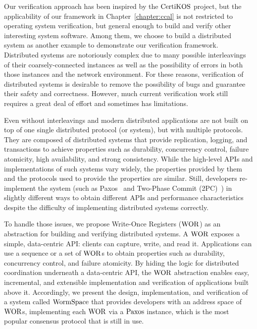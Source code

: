 
Our verification approach has been inspired by the $\mathrm{CertiKOS}$ project,
but the applicability of our framework in Chapter~\ref{chapter:ccal} is not restricted to operating system verification, but general enough
to build and verify other interesting system software. 
Among them, we choose to build a distributed system as another example to demonstrate our 
verification framework.
Distributed systems are notoriously complex due to  many possible interleavings of their coarsely-connected 
instances as well as the possibility of errors in both those instances and the network environment. 
For these reasons, verification of distributed systems is desirable to remove the possibility of bugs and guarantee their safety and correctness. 
However, much current verification work still requires a great deal of effort and sometimes has limitations.

Even without interleavings and%
modern distributed applications are not built on top of one single distributed protocol (or system), but with multiple protocols.
They are composed of distributed systems that provide replication, 
logging, and transactions to achieve properties such as durability, concurrency control, failure atomicity, high availability, and strong consistency.
While the high-level APIs and implementations of such systems vary widely, 
the properties provided by them and the protocols used to provide the properties are similar. 
Still, developers re-implement the system (such as Paxos~\cite{paxos} and 
Two-Phase Commit (2PC)~\cite{2PC}) in slightly different ways to obtain different APIs and performance 
characteristics despite the difficulty of implementing distributed systems correctly.

To handle those issues, we propose Write-Once Registers ($\mathrm{WOR}$) as an abstraction for building and verifying distributed systems. 
A $\mathrm{WOR}$ exposes a simple, data-centric API: 
clients can capture, write, and read it. 
Applications can use a sequence or a set of $\mathrm{WOR}$s to obtain properties such as durability, concurrency control, and failure atomicity. 
By hiding the logic for distributed coordination underneath a data-centric API, the $\mathrm{WOR}$ abstraction enables easy, incremental, 
and extensible implementation and verification of applications built above it. 
Accordingly, we present the design, implementation, and verification of a system called $\mathrm{WormSpace}$ 
that provides developers with an address space of $\mathrm{WOR}$s, implementing each $\mathrm{WOR}$ via a $\mathrm{Paxos}$ instance,
which is the most popular consensus protocol that is still in use. 

